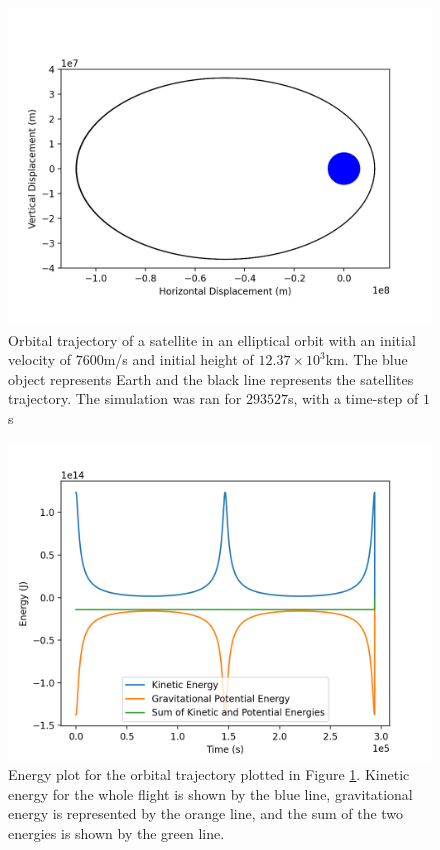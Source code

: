 \documentclass{revtex4-2}
\begin{document}
\begin{figure}
    \includegraphics[width = 0.96\linewidth]{EllipticalOrbit2d.png}
    \caption{Orbital trajectory of a satellite in an elliptical orbit with an initial velocity of $7600$m/s and initial height of $12.37\times10^3$km. The blue object represents Earth
        and the black line represents the satellites trajectory. The simulation was ran for $293527$s, with a time-step of $1$s}
    \label{EllipticalOrbit}
\end{figure}
\begin{figure}
    \includegraphics[width = 0.96\linewidth]{EllipticalEnergy.png}
    \caption{Energy plot for the orbital trajectory plotted in Figure \ref{EllipticalOrbit}. Kinetic energy for the whole flight is shown by the blue line, gravitational energy
        is represented by the orange line, and the sum of the two energies is shown by the green line.}
    \label{EllipticalOrbitEnergy}
\end{figure}
\end{document}
